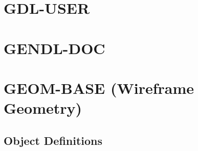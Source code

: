 \documentclass [11pt]{book}
\begin{document}
\section{GDL-USER }

\label{sec:gdl-user}







\section{GENDL-DOC }

\label{sec:gendl-doc}







\section{GEOM-BASE (Wireframe Geometry)}

\label{sec:geom-base(wireframegeometry)}





\subsection{Object Definitions}

\label{subsec:objectdefinitions}
\end{document}

